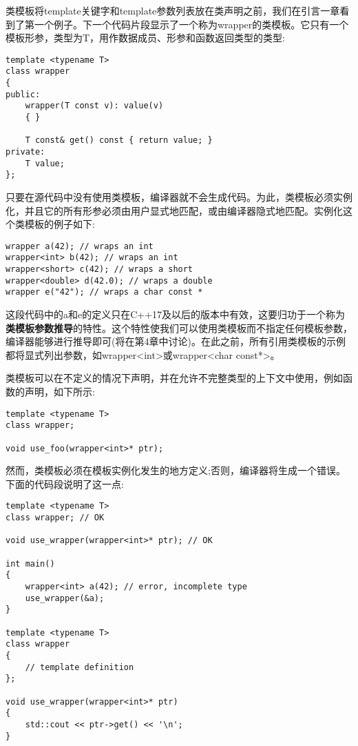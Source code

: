 类模板将template关键字和template参数列表放在类声明之前，我们在引言一章看到了第一个例子。下一个代码片段显示了一个称为wrapper的类模板。它只有一个模板形参，类型为T，用作数据成员、形参和函数返回类型的类型:

\begin{lstlisting}[style=styleCXX]
template <typename T>
class wrapper
{
public:
	wrapper(T const v): value(v)
	{ }
	
	T const& get() const { return value; }
private:
	T value;
};
\end{lstlisting}

只要在源代码中没有使用类模板，编译器就不会生成代码。为此，类模板必须实例化，并且它的所有形参必须由用户显式地匹配，或由编译器隐式地匹配。实例化这个类模板的例子如下:

\begin{lstlisting}[style=styleCXX]
wrapper a(42); // wraps an int
wrapper<int> b(42); // wraps an int
wrapper<short> c(42); // wraps a short
wrapper<double> d(42.0); // wraps a double
wrapper e("42"); // wraps a char const *
\end{lstlisting}

这段代码中的a和e的定义只在C++17及以后的版本中有效，这要归功于一个称为\textbf{类模板参数推导}的特性。这个特性使我们可以使用类模板而不指定任何模板参数，编译器能够进行推导即可(将在第4章中讨论)。在此之前，所有引用类模板的示例都将显式列出参数，如wrapper<int>或wrapper<char const*>。

类模板可以在不定义的情况下声明，并在允许不完整类型的上下文中使用，例如函数的声明，如下所示:

\begin{lstlisting}[style=styleCXX]
template <typename T>
class wrapper;

void use_foo(wrapper<int>* ptr);
\end{lstlisting}

然而，类模板必须在模板实例化发生的地方定义;否则，编译器将生成一个错误。下面的代码段说明了这一点:

\begin{lstlisting}[style=styleCXX]
template <typename T>
class wrapper; // OK

void use_wrapper(wrapper<int>* ptr); // OK

int main()
{
	wrapper<int> a(42); // error, incomplete type
	use_wrapper(&a);
}

template <typename T>
class wrapper
{
	// template definition
};

void use_wrapper(wrapper<int>* ptr)
{
	std::cout << ptr->get() << '\n';
}
\end{lstlisting}

